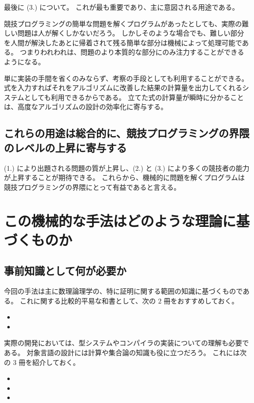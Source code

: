 \documentclass{ltjsarticle}
\begin{document}
最後に (3.) について。
これが最も重要であり、主に意図される用途である。

競技プログラミングの簡単な問題を解くプログラムがあったとしても、実際の難しい問題は人が解くしかないだろう。
しかしそのような場合でも、難しい部分を人間が解決したあとに帰着されて残る簡単な部分は機械によって処理可能である。
つまりわれわれは、問題のより本質的な部分にのみ注力することができるようになる。

単に実装の手間を省くのみならず、考察の手段としても利用することができる。
式を入力すればそれをアルゴリズムに改善した結果の計算量を出力してくれるシステムとしても利用できるからである。
立てた式の計算量が瞬時に分かることは、高度なアルゴリズムの設計の効率化に寄与する。

\subsection{これらの用途は総合的に、競技プログラミングの界隈のレベルの上昇に寄与する}

(1.) により出題される問題の質が上昇し、(2.) と (3.) により多くの競技者の能力が上昇することが期待できる。
これらから、機械的に問題を解くプログラムは競技プログラミングの界隈にとって有益であると言える。


\section{この機械的な手法はどのような理論に基づくものか}

\subsection{事前知識として何が必要か}

今回の手法は主に数理論理学の、特に証明に関する範囲の知識に基づくものである。
これに関する比較的平易な和書として、次の $2$ 冊をおすすめしておく。

\begin{itemize}
    \item {}
    \item {}
\end{itemize}

実際の開発においては、型システムやコンパイラの実装についての理解も必要である。
対象言語の設計には{\lambda}計算や集合論の知識も役に立つだろう。
これには次の $3$ 冊を紹介しておく。

\begin{itemize}
    \item {}
    \item {}
    \item {}
\end{itemize}
\end{document}
